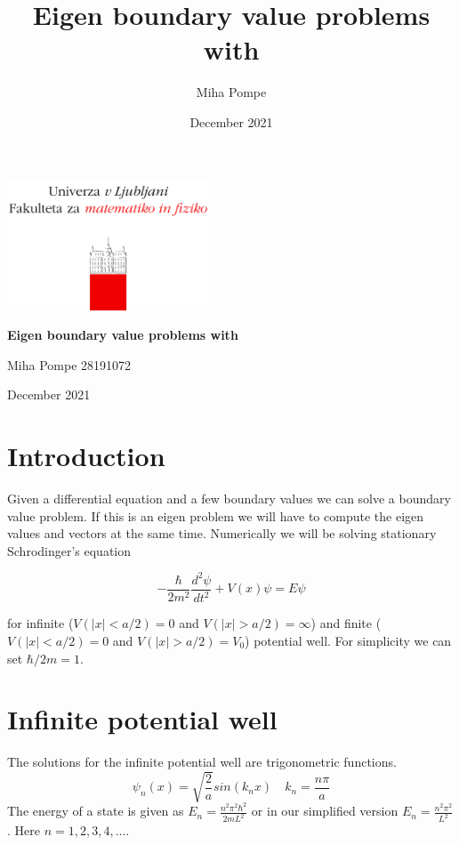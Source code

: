 \documentclass[12pt, a4paper]{article}
\title{Eigen boundary value problems with}
\author{Miha Pompe}
\date{December 2021}
\begin{document}
\begin{titlepage}
	\centering
 	\includegraphics[width=0.45\textwidth]{logo_fmf_uni-lj_sl_veliki.png}\par\vspace{1cm}

	\vspace{1cm}

	\vspace{1.5cm}
	{\huge\bfseries Eigen boundary value problems with\par}
	\vspace{2cm}
	{\Large Miha Pompe 28191072\par}
	\vfill

	\vfill

	{\large December 2021\par}
\end{titlepage}
\thispagestyle{empty}
\clearpage
{}
\newpage


\section{Introduction}

Given a differential equation and a few boundary values we can solve a boundary value problem. If this is an eigen problem we will have to compute the eigen values and vectors at the same time. Numerically we will be solving stationary Schrodinger's equation

\begin{equation*}
    -\frac{\hbar}{2m^2}\frac{d^2\psi}{dt^2} + V(x)\psi = E\psi
\end{equation*}

for infinite ($V(|x| < a/2) = 0$ and $V(|x| > a/2) = \infty$) and finite ($V(|x| < a/2) = 0$ and $V(|x| > a/2) = V_0$) potential well. For simplicity we can set $\hbar/2m = 1$.

\section{Infinite potential well}
The solutions for the infinite potential well are trigonometric functions.
\begin{equation*}
    \psi_n(x) = \sqrt{\frac{2}{a}} sin(k_n x) \quad k_n = \frac{n\pi}{a}
\end{equation*}
The energy of a state is given as $E_n = \frac{n^2\pi^2\hbar^2}{2mL^2}$ or in our simplified version $E_n = \frac{n^2\pi^2}{L^2}$. Here $n = 1,2,3,4,...$.
\end{document}
